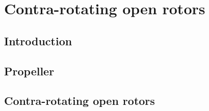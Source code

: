 \chapter{Contra-rotating open rotors}
\label{cha:cror}

\chabstract{}

\minitoc
\newpage

\section{Introduction}
\label{sec:cror_intro}


\section{Propeller}
\label{sec:cror_propeller}


\section{Contra-rotating open rotors}
\label{sec:cror_cror}


\chconclu{}
